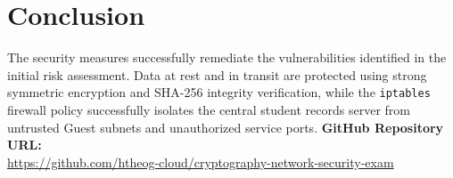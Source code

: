 \documentclass[11pt,a4paper]{article}
\begin{document}
\section{Conclusion}
The security measures successfully remediate the vulnerabilities identified in the initial risk assessment. Data at rest and in transit are protected using strong symmetric encryption and SHA-256 integrity verification, while the \texttt{iptables} firewall policy successfully isolates the central student records server from untrusted Guest subnets and unauthorized service ports.
\vspace{0.5cm}
\noindent\textbf{GitHub Repository URL:} \\
\url{https://github.com/htheog-cloud/cryptography-network-security-exam}
\end{document}
